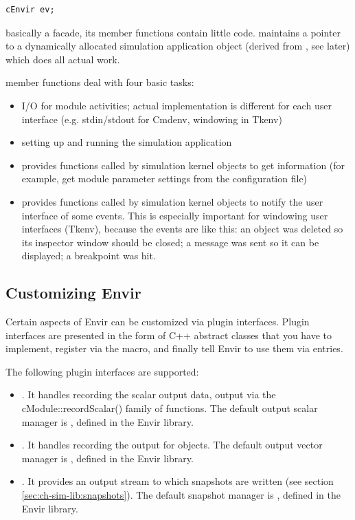 \begin{verbatim}
cEnvir ev;
\end{verbatim}

 basically a facade, its member functions
contain little code.  maintains a pointer to a
dynamically allocated simulation application object (derived from
, see later) which does all actual work.


 member functions deal with four basic tasks:
\begin{itemize}
  \item{I/O for module activities; actual implementation is different
    for each user interface (e.g. stdin/stdout for Cmdenv, windowing
    in Tkenv)}
  \item{setting up and running the simulation application}
  \item{provides functions called by simulation kernel objects to
    get information (for example, get module parameter settings
    from the configuration file)}
  \item{provides functions called by simulation kernel objects to
    notify the user interface of some events. This is especially
    important for windowing user interfaces (Tkenv), because the
    events are like this: an object was deleted so its inspector
    window should be closed; a message was sent so it can be
    displayed; a breakpoint was hit.}
\end{itemize}


\subsection{Customizing Envir}
\label{sec:ch-opp-design:customization}

Certain aspects of Envir can be customized via plugin interfaces.
Plugin interfaces are presented in the form of C++ abstract classes
that you have to implement, register via the 
macro, and finally tell Envir to use them via  entries.

The following plugin interfaces are supported:

\begin{itemize}
   \item{. It handles recording the scalar output data,
     output via the cModule::recordScalar() family of functions.
     The default output scalar manager is ,
     defined in the Envir library.}
   \item{. It handles recording the output
     for  objects.
     The default output vector manager is ,
     defined in the Envir library.}
   \item{. It provides an output stream to which
     snapshots are written (see section \ref{sec:ch-sim-lib:snapshots}).
     The default snapshot manager is ,
     defined in the Envir library.}
\end{itemize}

